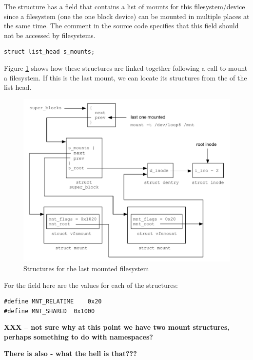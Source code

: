 \noindent
The  structure has a field that contains a list of mounts for this filesystem/device since a filesystem (one the one block device) can be mounted in multiple places at the same time. The comment in the source code specifies that this field should not be accessed by filesystems.

\begin{lstlisting}
struct list_head s_mounts; 
\end{lstlisting}

\noindent
Figure  \ref{fig:mount-vfsmount} shows how these structures are linked together following a call to mount a filesystem. If this is the last mount, we can locate its structures from the  of the  list head.

\begin{figure}[h]
	\includegraphics[scale=0.6]{figures/mount-vfsmount.pdf}
	\centering
	\caption{Structures for the last mounted filesystem}
	\label{fig:mount-vfsmount}
\end{figure}

For the  field here are the values for each of the  structures:

\begin{lstlisting}
#define MNT_RELATIME	0x20
#define MNT_SHARED	0x1000
\end{lstlisting}

\noindent
\textbf{XXX -- not sure why at this point we have two mount structures, perhaps something to do with namespaces?}

\textbf{There is also  - what the hell is that???}

